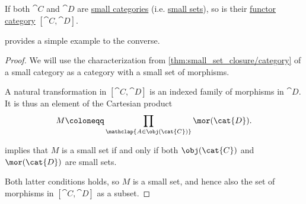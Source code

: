 \begin{proposition}\label{thm:functor_category_size}
  If both \( \cat{C} \) and \( \cat{D} \) are \hyperref[def:small_category]{small categories} (i.e. \hyperref[def:small_set]{small sets}), so is their \hyperref[def:functor_category]{functor category} \( [\cat{C}, \cat{D}] \).
\end{proposition}
\begin{comments}
  \item {} provides a simple example to the converse.
\end{comments}
\begin{proof}
  We will use the characterization from \cref{thm:small_set_closure/category} of a small category as a category with a small set of morphisms.

  A natural transformation in \( [\cat{C}, \cat{D}] \) is an indexed family of morphisms in \( \cat{D} \). It is thus an element of the Cartesian product
  \begin{equation*}
    M \coloneqq \prod_{\mathclap{A \in \obj(\cat{C})}} \mor(\cat{D}).
  \end{equation*}

   implies that \( M \) is a small set if and only if both \( \obj(\cat{C}) \) and \( \mor(\cat{D}) \) are small sets.

  Both latter conditions holds, so \( M \) is a small set, and hence also the set of morphisms in \( [\cat{C}, \cat{D}] \) as a subset.
\end{proof}

